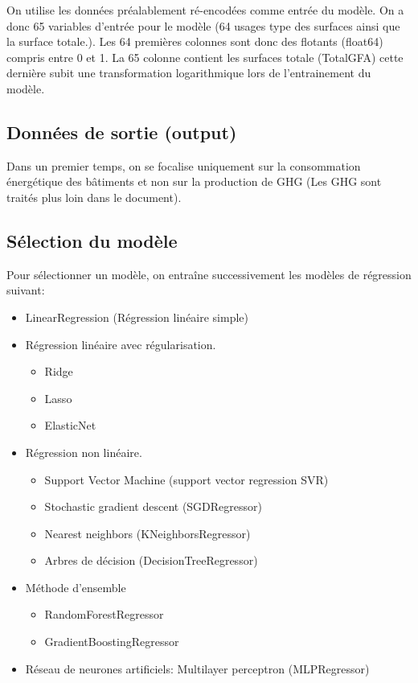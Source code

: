 On utilise les données préalablement ré-encodées comme entrée du modèle.
On a donc 65 variables d'entrée pour le modèle (64 usages type des surfaces ainsi
que la surface totale.).
Les 64 premières colonnes sont donc des flotants (float64) compris entre 0 et 1.
La 65 colonne contient les surfaces totale (TotalGFA) cette dernière
subit une transformation logarithmique lors de l'entrainement du modèle.

\subsection{Données de sortie (output)}

Dans un premier temps, on se focalise uniquement sur la consommation énergétique
des bâtiments et non sur la production de GHG (Les GHG sont traités plus loin
dans le document).

\subsection{Sélection du modèle}

Pour sélectionner un modèle, on entraîne successivement les modèles de
régression suivant:
\begin{itemize}
  \item LinearRegression (Régression linéaire simple)
  \item Régression linéaire avec régularisation.
  \begin{itemize}
    \item Ridge \cite{Marquardt1975}
    \item Lasso \cite{tibshirani96regression}
    \item ElasticNet
  \end{itemize}
  \item Régression non linéaire.
  \begin{itemize}
    \item Support Vector Machine (support vector regression SVR)
    \item Stochastic gradient descent (SGDRegressor)
    \item Nearest neighbors (KNeighborsRegressor)
    \item Arbres de décision (DecisionTreeRegressor)
  \end{itemize}
  \item Méthode d'ensemble
  \begin{itemize}
    \item RandomForestRegressor
    \item GradientBoostingRegressor
  \end{itemize}
  \item Réseau de neurones artificiels: Multilayer perceptron (MLPRegressor)
\end{itemize}

